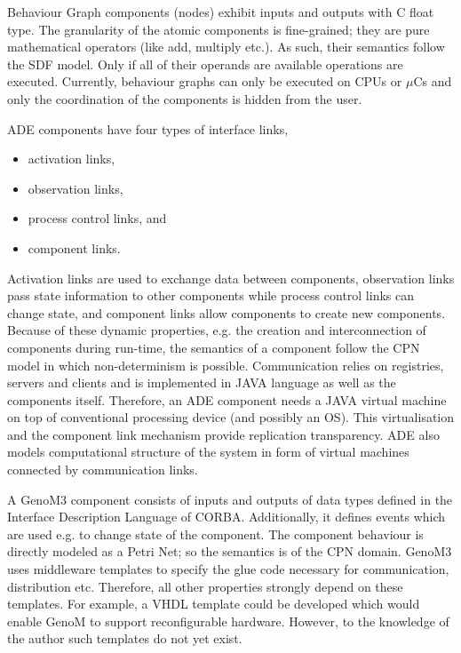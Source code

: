 \documentclass[a4paper,twocolumn]{esapub2005} %
\begin{document}
Behaviour Graph components (nodes) exhibit inputs and outputs with C float type.
The granularity of the atomic components is fine-grained; they are pure mathematical operators (like add, multiply etc.).
As such, their semantics follow the SDF model.
Only if all of their operands are available operations are executed.
Currently, behaviour graphs can only be executed on CPUs or $\mu$Cs and only the coordination of the components is hidden from the user.

ADE components have four types of interface links,
\begin{itemize}
    \item activation links,
    \item observation links,
    \item process control links, and
    \item component links.
\end{itemize}
Activation links are used to exchange data between components,
observation links pass state information to other components while process control links can change state,
and component links allow components to create new components.
Because of these dynamic properties, e.g. the creation and interconnection of components during run-time, the semantics of a component follow the CPN model in which non-determinism is possible.
Communication relies on registries, servers and clients and is implemented in JAVA language as well as the components itself.
Therefore, an ADE component needs a JAVA virtual machine on top of conventional processing device (and possibly an OS).
This virtualisation and the component link mechanism provide replication transparency.
ADE also models computational structure of the system in form of virtual machines connected by communication links.

A GenoM3 component consists of inputs and outputs of data types defined in the Interface Description Language of CORBA.
Additionally, it defines events which are used e.g. to change state of the component.
The component behaviour is directly modeled as a Petri Net; so the semantics is of the CPN domain.
GenoM3 uses middleware templates to specify the glue code necessary for communication, distribution etc.
Therefore, all other properties strongly depend on these templates.
For example, a VHDL template could be developed which would enable GenoM to support reconfigurable hardware.
However, to the knowledge of the author such templates do not yet exist.
\end{document}
